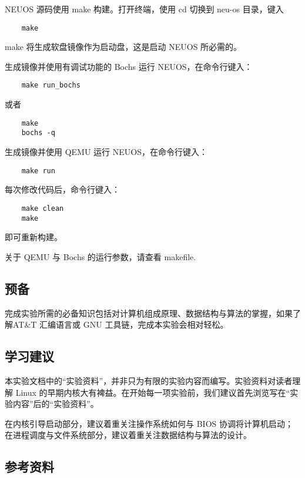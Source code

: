 NEUOS 源码使用 make 构建。打开终端，使用 cd 切换到 neu-os 目录，键入

\begin{lstlisting}
    make
\end{lstlisting}

make 将生成软盘镜像作为启动盘，这是启动 NEUOS 所必需的。

生成镜像并使用有调试功能的 Bochs 运行 NEUOS，在命令行键入：

\begin{lstlisting}
	make run_bochs
\end{lstlisting}

或者

\begin{lstlisting}
	make
	bochs -q
\end{lstlisting}

生成镜像并使用 QEMU 运行 NEUOS，在命令行键入：

\begin{lstlisting}
	make run
\end{lstlisting}

每次修改代码后，命令行键入：

\begin{lstlisting}
	make clean
	make
\end{lstlisting}

即可重新构建。

关于 QEMU 与 Bochs 的运行参数，请查看 makefile.

\subsection{预备}

完成实验所需的必备知识包括对计算机组成原理、数据结构与算法的掌握，如果了解AT\&T 汇编语言或 GNU 工具链，完成本实验会相对轻松。

\subsection{学习建议}

本实验文档中的“实验资料”，并非只为有限的实验内容而编写。实验资料对读者理解 Linux 的早期内核大有裨益。在开始每一项实验前，我们建议首先浏览写在“实验内容”后的“实验资料”。

在内核引导启动部分，建议着重关注操作系统如何与 BIOS 协调将计算机启动；在进程调度与文件系统部分，建议着重关注数据结构与算法的设计。


\subsection{参考资料}

